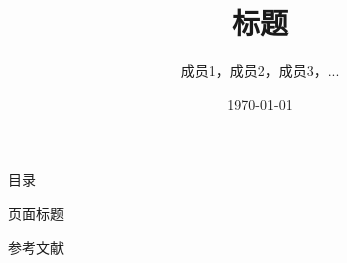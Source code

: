 \documentclass[aspectratio=1610]{beamer}
\title[题目1]{标题}
\author[成员1]{成员1，成员2，成员3，...}
\institute[青海民族大学]{青海民族大学}
\date{\today}
\begin{document}
\begin{frame} \titlepage \end{frame}
\begin{frame}[t, allowframebreaks]{目录} \tableofcontents \end{frame}

\begin{frame}[t, allowframebreaks]{页面标题}
    
\end{frame}

\begin{frame}[t, allowframebreaks]{参考文献}
    
    
\end{frame}
\end{document}
